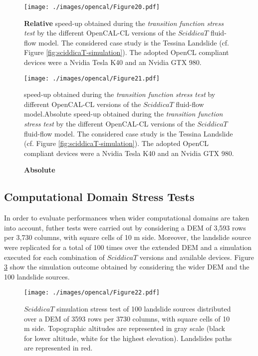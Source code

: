 \begin{figure}
	\begin{center}
		\texttt{[image: ./images/opencal/Figure20.pdf]}
		\caption[\textbf{Relative} speed-up obtained during the \emph{transition function stress test} by different OpenCAL-CL versions of the $SciddicaT$ fluid-flow model.]{\textbf{Relative} speed-up obtained during the \emph{transition function stress
				test} by the different OpenCAL-CL versions of the $SciddicaT$
			fluid-flow model. The considered case study is the Tessina Landslide
			(cf. Figure \ref{fig:sciddicaT-simulation}). The adopted OpenCL
			compliant devices were a Nvidia Tesla K40 and an Nvidia GTX 980.}
		\label{gr:sciddicaT-CL-relative-speed-up-stress}
	\end{center}
\end{figure}

\begin{figure}
	\begin{center}
		\texttt{[image: ./images/opencal/Figure21.pdf]}
		\caption\textbf{Absolute} speed-up obtained during the \emph{transition function stress test} by different OpenCAL-CL versions of the $SciddicaT$ fluid-flow model.{Absolute speed-up obtained during the \emph{transition function stress
				test} by the different OpenCAL-CL versions of the $SciddicaT$
			fluid-flow model. The considered case study is the Tessina Landslide
			(cf. Figure \ref{fig:sciddicaT-simulation}). The adopted OpenCL
			compliant devices were a Nvidia Tesla K40 and an Nvidia GTX 980.}
		\label{gr:sciddicaT-CL-absolute-speed-up-stress}
	\end{center}
\end{figure}
\subsection{Computational Domain Stress Tests}
\label{sec:opencal_stress_testR}
In order to evaluate performances when wider computational domains
are taken into account, futher tests were carried out by
considering a DEM of 3,593 rows per 3,730 columns, with square
cells of 10 m side. Moreover, the landslide source were replicated
for a total of 100 times over the extended DEM and a simulation
executed for each combination of $SciddicaT$ versions and
available devices. Figure \ref{fig:stresstestR} show the
simulation outcome obtained by considering the wider DEM and the
100 landslide sources.

\begin{figure}
	\begin{center}
		\texttt{[image: ./images/opencal/Figure22.pdf]}
		\caption[$SciddicaT$ simulation stress test of 100 landslide sources]{$SciddicaT$ simulation stress test of 100 landslide sources
			distributed over a DEM of 3593 rows per 3730 columns, with square
			cells of 10 m side. Topographic altitudes are represented in gray
			scale (black for lower altitude, white for the highest
			elevation). Landslides paths are represented in red.}
		\label{fig:stresstestR}
	\end{center}
\end{figure}

